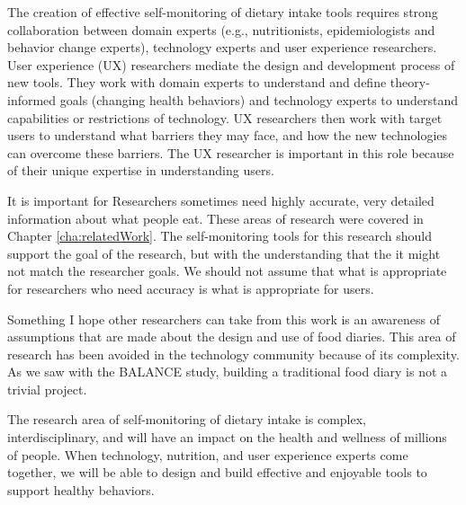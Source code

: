 The creation of effective self-monitoring of dietary intake tools requires strong collaboration between domain experts (e.g., nutritionists, epidemiologists and behavior change experts), technology experts and user experience researchers. User experience (UX) researchers mediate the design and development process of new tools. They work with domain experts to understand and define theory-informed goals (changing health behaviors) and technology experts to understand capabilities or restrictions of technology. UX researchers then work with target users to understand what barriers they may face, and how the new technologies can overcome these barriers. The UX researcher is important in this role because of their unique expertise in understanding users. 


It is important for Researchers sometimes need highly accurate, very detailed information about what people eat. These areas of research were covered in Chapter \ref{cha:relatedWork}. The self-monitoring tools for this research should support the goal of the research, but with the understanding that the it might not match the researcher goals. We should not  assume that what is appropriate for researchers who need accuracy is what is appropriate for users. 

Something I hope other researchers can take from this work is an awareness of assumptions that are made about the design and use of food diaries. This area of research has been avoided in the technology community because of its complexity. As we saw with the BALANCE study, building a traditional food diary is not a trivial project. 



The research area of self-monitoring of dietary intake is complex, interdisciplinary, and will have an impact on the health and wellness of millions of people. When technology, nutrition, and user experience experts come together, we will be able to design and build effective and enjoyable tools to support healthy behaviors. 

